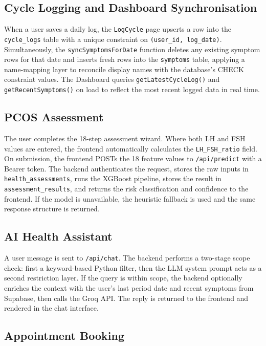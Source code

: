 \subsection{Cycle Logging and Dashboard Synchronisation}
\label{subsec:flow-cycle}

When a user saves a daily log, the \texttt{LogCycle} page upserts a row into the \texttt{cycle\_logs} table with a unique constraint on \texttt{(user\_id, log\_date)}. Simultaneously, the \texttt{syncSymptomsForDate} function deletes any existing symptom rows for that date and inserts fresh rows into the \texttt{symptoms} table, applying a name-mapping layer to reconcile display names with the database's CHECK constraint values. The Dashboard queries \texttt{getLatestCycleLog()} and \texttt{getRecentSymptoms()} on load to reflect the most recent logged data in real time.

\subsection{PCOS Assessment}
\label{subsec:flow-pcos}

The user completes the 18-step assessment wizard. Where both LH and FSH values are entered, the frontend automatically calculates the \texttt{LH\_FSH\_ratio} field. On submission, the frontend POSTs the 18 feature values to \texttt{/api/predict} with a Bearer token. The backend authenticates the request, stores the raw inputs in \texttt{health\_assessments}, runs the XGBoost pipeline, stores the result in \texttt{assessment\_results}, and returns the risk classification and confidence to the frontend. If the model is unavailable, the heuristic fallback is used and the same response structure is returned.

\subsection{AI Health Assistant}
\label{subsec:flow-chat}

A user message is sent to \texttt{/api/chat}. The backend performs a two-stage scope check: first a keyword-based Python filter, then the LLM system prompt acts as a second restriction layer. If the query is within scope, the backend optionally enriches the context with the user's last period date and recent symptoms from Supabase, then calls the Groq API. The reply is returned to the frontend and rendered in the chat interface.

\subsection{Appointment Booking}
\label{subsec:flow-booking}

